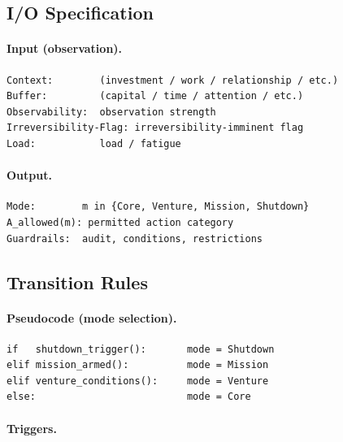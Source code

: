 \subsection{I/O Specification}
\label{sec:def-offense-io}

\paragraph{Input (observation).}

\begin{lstlisting}[basicstyle=\ttfamily\small,frame=single]
Context:        (investment / work / relationship / etc.)
Buffer:         (capital / time / attention / etc.)
Observability:  observation strength
Irreversibility-Flag: irreversibility-imminent flag
Load:           load / fatigue
\end{lstlisting}

\paragraph{Output.}

\begin{lstlisting}[basicstyle=\ttfamily\small,frame=single]
Mode:        m in {Core, Venture, Mission, Shutdown}
A_allowed(m): permitted action category
Guardrails:  audit, conditions, restrictions
\end{lstlisting}

\subsection{Transition Rules}
\label{sec:def-offense-transition-rules}

\paragraph{Pseudocode (mode selection).}

\begin{lstlisting}[basicstyle=\ttfamily\small,frame=single]
if   shutdown_trigger():       mode = Shutdown
elif mission_armed():          mode = Mission
elif venture_conditions():     mode = Venture
else:                          mode = Core
\end{lstlisting}

\paragraph{Triggers.}

